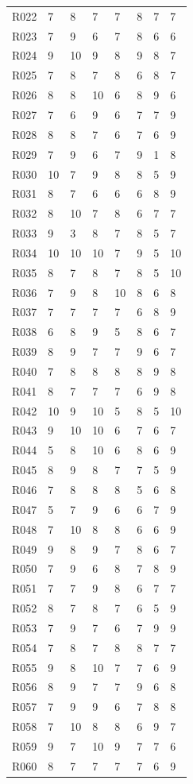 {\begin{longtable}{L{1.05cm}R{1.42cm}R{1.42cm}R{1.42cm}R{1.42cm}R{1.42cm}R{1.42cm}R{1.42cm}}
R022 & 7 & 8 & 7 & 7 & 8 & 7 & 7 \\
R023 & 7 & 9 & 6 & 7 & 8 & 6 & 6 \\
R024 & 9 & 10 & 9 & 8 & 9 & 8 & 7 \\
R025 & 7 & 8 & 7 & 8 & 6 & 8 & 7 \\
R026 & 8 & 8 & 10 & 6 & 8 & 9 & 6 \\
R027 & 7 & 6 & 9 & 6 & 7 & 7 & 9 \\
R028 & 8 & 8 & 7 & 6 & 7 & 6 & 9 \\
R029 & 7 & 9 & 6 & 7 & 9 & 1 & 8 \\
R030 & 10 & 7 & 9 & 8 & 8 & 5 & 9 \\
R031 & 8 & 7 & 6 & 6 & 6 & 8 & 9 \\
R032 & 8 & 10 & 7 & 8 & 6 & 7 & 7 \\
R033 & 9 & 3 & 8 & 7 & 8 & 5 & 7 \\
R034 & 10 & 10 & 10 & 7 & 9 & 5 & 10 \\
R035 & 8 & 7 & 8 & 7 & 8 & 5 & 10 \\
R036 & 7 & 9 & 8 & 10 & 8 & 6 & 8 \\
R037 & 7 & 7 & 7 & 7 & 6 & 8 & 9 \\
R038 & 6 & 8 & 9 & 5 & 8 & 6 & 7 \\
R039 & 8 & 9 & 7 & 7 & 9 & 6 & 7 \\
R040 & 7 & 8 & 8 & 8 & 8 & 9 & 8 \\
R041 & 8 & 7 & 7 & 7 & 6 & 9 & 8 \\
R042 & 10 & 9 & 10 & 5 & 8 & 5 & 10 \\
R043 & 9 & 10 & 10 & 6 & 7 & 6 & 7 \\
R044 & 5 & 8 & 10 & 6 & 8 & 6 & 9 \\
R045 & 8 & 9 & 8 & 7 & 7 & 5 & 9 \\
R046 & 7 & 8 & 8 & 8 & 5 & 6 & 8 \\
R047 & 5 & 7 & 9 & 6 & 6 & 7 & 9 \\
R048 & 7 & 10 & 8 & 8 & 6 & 6 & 9 \\
R049 & 9 & 8 & 9 & 7 & 8 & 6 & 7 \\
R050 & 7 & 9 & 6 & 8 & 7 & 8 & 9 \\
R051 & 7 & 7 & 9 & 8 & 6 & 7 & 7 \\
R052 & 8 & 7 & 8 & 7 & 6 & 5 & 9 \\
R053 & 7 & 9 & 7 & 6 & 7 & 9 & 9 \\
R054 & 7 & 8 & 7 & 8 & 8 & 7 & 7 \\
R055 & 9 & 8 & 10 & 7 & 7 & 6 & 9 \\
R056 & 8 & 9 & 7 & 7 & 9 & 6 & 8 \\
R057 & 7 & 9 & 9 & 6 & 7 & 8 & 8 \\
R058 & 7 & 10 & 8 & 8 & 6 & 9 & 7 \\
R059 & 9 & 7 & 10 & 9 & 7 & 7 & 6 \\
R060 & 8 & 7 & 7 & 7 & 7 & 6 & 9 \\
\end{longtable}
}